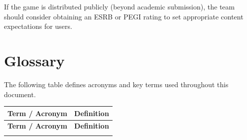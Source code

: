 \documentclass[12pt, letterpaper]{article}
\begin{document}
If the game is distributed publicly (beyond academic submission), the team should consider obtaining an ESRB or PEGI rating to set appropriate content expectations for users.

\newpage

\section{Glossary}
\label{sec:glossary}

The following table defines acronyms and key terms used throughout this document.

\vspace{0.5em}
\begin{longtable}{>{\bfseries}p{3cm} p{10.5cm}}
    \toprule
    \textbf{Term / Acronym} & \textbf{Definition} \\
    \midrule
    \endfirsthead
    \toprule
    \textbf{Term / Acronym} & \textbf{Definition} \\
    \midrule
    \endhead
    \bottomrule
    \endfoot


\end{longtable}
\end{document}
